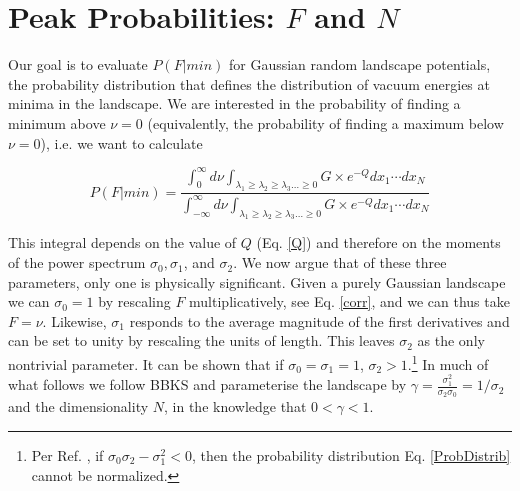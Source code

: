 \documentclass[12pt]{article}
\newcommand{\re}[1]{\textcolor{blue}{[{\bf RE}: #1]}}
\newcommand{\lfl}[1]{\textcolor{red}{[{\bf LL}: #1]}}
\begin{document}
\section{Peak Probabilities: $F$ and $N$} \label{PeakNumbers}

Our goal  is to evaluate $P(F|min)$ for  Gaussian random landscape potentials, the probability distribution that defines the distribution of vacuum energies at minima in the landscape. We are interested in the probability of finding a minimum above $\nu = 0$ (equivalently, the probability of finding a maximum below $\nu = 0$), i.e. we want to calculate

\begin{equation} \label{PminIntegral}
P(F|min) =  \frac{\int^\infty_0 d\nu \int_{\lambda_1 \geq \lambda_2 \geq \lambda_3 \ldots \geq 0} G \times e^{-Q} dx_1  \cdots dx_N}{\int^\infty_{-\infty} d\nu \int_{\lambda_1 \geq \lambda_2 \geq \lambda_3 \ldots \geq 0} G \times e^{-Q} dx_1  \cdots dx_N}
\end{equation}

This integral depends on the value of $Q$ (Eq. \ref{Q})  and therefore on the moments of the power spectrum $\sigma_0, \sigma_1$,  and $\sigma_2$. We now argue that of these three parameters, only one is physically significant. Given a purely Gaussian landscape we can $\sigma_0=1$ by rescaling $F$ multiplicatively, see Eq. \ref{corr}, and we can thus take $F = \nu$. Likewise, $\sigma_1$ responds to the average magnitude of the first derivatives and can be set to unity by rescaling the units of length. This leaves $\sigma_2$ as the only nontrivial parameter. It can be shown that if $\sigma_0=\sigma_1=1$, $\sigma_2>1$.\footnote{Per Ref. \cite{Yamada2018}, if $\sigma_0\sigma_2 - \sigma_1^2 < 0$, then the probability distribution Eq. \ref{ProbDistrib} cannot be normalized.} In much of what follows we follow BBKS and parameterise the landscape by $\gamma = \frac{\sigma_1^2}{\sigma_2 \sigma_0}=1/\sigma_2$ and the dimensionality $N$,  in the knowledge that $0<\gamma<1$.

\end{document}
